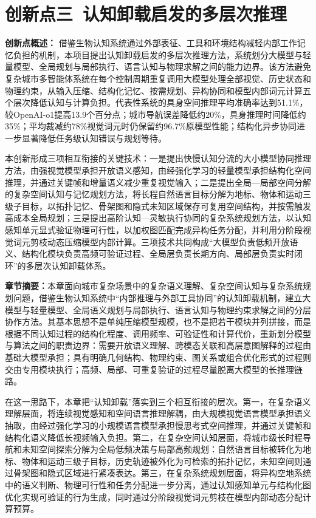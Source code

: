 \section{创新点三\ 认知卸载启发的多层次推理}

\noindent\textbf{创新点概述：}
借鉴生物认知系统通过外部表征、工具和环境结构减轻内部工作记忆负担的机制，本项目提出认知卸载启发的多层次推理方法，系统划分大模型与轻量模型、全局规划与局部执行、语言认知与物理求解之间的能力边界。该方法避免复杂城市多智能体系统在每个控制周期重复调用大模型处理全部视觉、历史状态和物理约束，从输入压缩、结构化记忆、按需规划、异构协同和模型内部词元计算五个层次降低认知与计算负担。代表性系统的具身空间推理平均准确率达到51.1\%，较OpenAI-o1提高13.9个百分点；城市导航误差降低约20\%，具身推理时间降低约35\%；平均裁减约78\%视觉词元时仍保留约96.7\%原模型性能；结构化异步协同进一步显著降低任务级认知错误与规划等待。

本创新形成三项相互衔接的关键技术：一是提出快慢认知分流的大小模型协同推理方法，由强视觉模型承担开放语义感知，由经强化学习的轻量模型承担结构化空间推理，并通过关键帧和增量语义减少重复视觉输入；二是提出全局—局部空间分解的复杂空间认知与记忆规划方法，将长程自然语言目标分解为地标、物体和运动三级子目标，以拓扑记忆、骨架图和隐式未知区域保存可复用空间结构，并按需触发高成本全局规划；三是提出高阶认知—灵敏执行协同的复杂系统规划方法，以认知感知单元显式验证物理可行性，以加权图匹配完成异构任务分配，并利用分阶段视觉词元剪枝动态压缩模型内部计算。三项技术共同构成“大模型负责低频开放语义、结构化模块负责高频可验证过程、全局层负责长期方向、局部层负责实时闭环”的多层次认知卸载体系。



\noindent\textbf{章节摘要：}本章面向城市复杂场景中的复杂语义理解、复杂空间认知与复杂系统规划问题，借鉴生物认知系统中“内部推理与外部工具协同”的认知卸载机制，建立大模型与轻量模型、全局语义规划与局部执行、语言认知与物理约束求解之间的分层协作方法。其基本思想不是单纯压缩模型规模，也不是把若干模块并列拼接，而是根据不同认知过程的结构化程度、调用频率、可验证性和计算代价，重新划分模型与算法之间的职责边界：需要开放语义理解、跨模态关联和高层意图解释的过程由基础大模型承担；具有明确几何结构、物理约束、图关系或组合优化形式的过程则交由专用模块执行；高频、局部、可重复验证的过程尽量脱离大模型的长推理链路。

在这一思路下，本章把“认知卸载”落实到三个相互衔接的层次。第一，在复杂语义理解层面，将连续视觉感知和空间语言推理解耦，由大规模视觉语言模型承担语义抽取，由经过强化学习的小规模语言模型承担慢思考式空间推理，并通过关键帧和结构化语义降低长视频输入负担。第二，在复杂空间认知层面，将城市级长时程导航和未知空间探索分解为全局低频决策与局部高频规划：自然语言目标被转化为地标、物体和运动三级子目标，历史轨迹被外化为可检索的拓扑记忆，未知空间则通过骨架图和隐式区域进行紧凑表达。第三，在复杂系统规划层面，将异构空地系统中的语义判断、物理可行性和任务分配进一步分离，通过认知感知单元与结构化图优化实现可验证的行为生成，同时通过分阶段视觉词元剪枝在模型内部动态分配计算预算。

